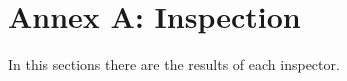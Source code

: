 
\section{Annex A: Inspection}

%
%
In this sections there are the results of each inspector.

\begin{small}


\end{small}
